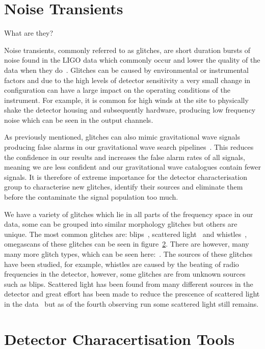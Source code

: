 \section{Noise Transients}

What are they?

Noise transients, commonly referred to as glitches, are short duration bursts of noise found in the LIGO data which commonly occur and lower the quality of the data when they do~\cite{}. Glitches can be caused by environmental or instrumental factors and due to the high levels of detector sensitivity a very small change in configuration can have a large impact on the operating conditions of the instrument. For example, it is common for high winds at the site to physically shake the detector housing and subsequently hardware, producing low frequency noise which can be seen in the output channels. 

As previously mentioned, glitches can also mimic gravitational wave signals producing false alarms in our gravitational wave search pipelines~\cite{}. This reduces the confidence in our results and increases the false alarm rates of all signals, meaning we are less confident and our gravitational wave catalogues contain fewer signals. It is therefore of extreme importance for the detector characterisation group to characterise new glitches, identify their sources and eliminate them before the contaminate the signal population too much.

We have a variety of glitches which lie in all parts of the frequency space in our data, some can be grouped into similar morphology glitches but others are unique. The most common glitches are: blips~\cite{}, scattered light~\cite{} and whistles~\cite{}, omegascans of these glitches can be seen in figure~\ref{}. There are however, many many more glitch types, which can be seen here:~\cite{}. The sources of these glitches have been studied, for example, whistles are caused by the beating of radio frequencies in the detector, however, some glitches are from unknown sources such as blips. Scattered light has been found from many different sources in the detector and great effort has been made to reduce the prescence of scattered light in the data~\cite{soni_scattered} but as of the fourth observing run some scattered light still remains.
%
%
\section{Detector Characertisation Tools}

